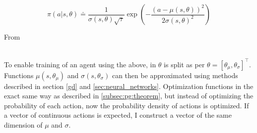 \begin{equation}
    \pi(a|s,\theta) \doteq \frac{1}{\sigma(s,\theta)\sqrt{\tau}}\exp \left(-\frac{\left(a-\mu(s,\theta)\right)^2}{2\sigma(s,\theta)^2}\right)
\end{equation}
\centerline{From }
\noindent
\\ To enable training of an agent using the above, in  $\theta$ is split as per $\theta = [\theta_\mu, \theta_\sigma]^\top$. Functions $\mu(s, \theta_\mu)$ and $\sigma(s, \theta_\sigma)$ can then be approximated using methods described in section \ref{gd} and \ref{sec:neural_networks}. Optimization functions in the exact same way as described in \ref{subsec:pg:theorem}, but instead of optimizing the probability of each action, now the probability density of actions is optimized. If a vector of continuous actions is expected, I construct a vector of the same dimension of $\mu$ and $\sigma$.
